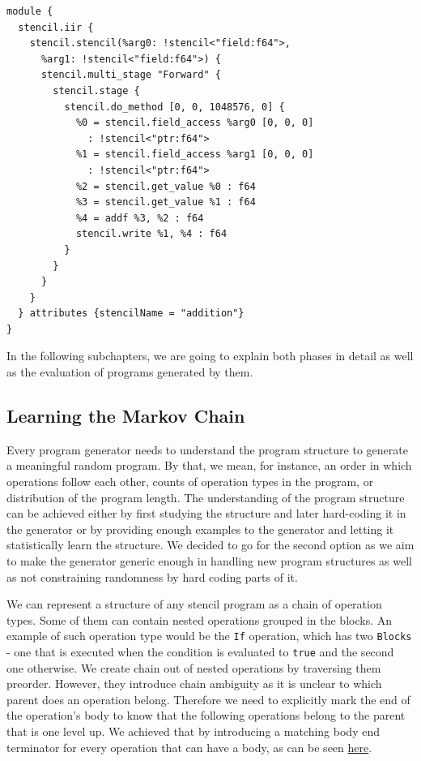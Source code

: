 \documentclass[sigplan,\review anonymous]{acmart}
\begin{document}
\begin{lstlisting}[caption={An example of the program generated 
  from the chain},captionpos=b\label{lst:sample}]
module {
  stencil.iir {
    stencil.stencil(%arg0: !stencil<"field:f64">,
      %arg1: !stencil<"field:f64">) {
      stencil.multi_stage "Forward" {
        stencil.stage {
          stencil.do_method [0, 0, 1048576, 0] {
            %0 = stencil.field_access %arg0 [0, 0, 0]
              : !stencil<"ptr:f64">
            %1 = stencil.field_access %arg1 [0, 0, 0]
              : !stencil<"ptr:f64">
            %2 = stencil.get_value %0 : f64
            %3 = stencil.get_value %1 : f64
            %4 = addf %3, %2 : f64
            stencil.write %1, %4 : f64
          }
        }
      }
    }
  } attributes {stencilName = "addition"}
}
\end{lstlisting}

In the following subchapters, we are going to explain both phases in detail
as well as the evaluation of programs generated by them.

\subsection{Learning the Markov Chain}
Every program generator needs to understand the program structure to generate
a meaningful random program. By that, we mean, for instance, an order in which
operations follow each other, counts of operation types in the program, or
distribution of the program length. The understanding of the program structure
can be achieved either by first studying the structure and later hard-coding
it in the generator or by providing enough examples to the generator and
letting it statistically learn the structure. We decided to go for the second
option as we aim to make the generator generic enough in handling new program
structures as well as not constraining randomness by hard coding parts of it.

We can represent a structure of any stencil program as a chain of operation
types. Some of them can contain nested operations grouped in the blocks. An
example of such operation type would be the \texttt{If} operation, which has
two \texttt{Blocks} - one that is executed when the condition is evaluated to
\texttt{true} and the second one otherwise. We create chain out of nested
operations by traversing them preorder. However, they introduce chain
ambiguity as it is unclear to which parent does an operation belong. Therefore
we need to explicitly mark the end of the operation's body to know that the
following operations belong to the parent that is one level up. We achieved
that by introducing a matching body end terminator for every operation that
can have a body, as can be seen \hyperref[chain]{here}.
\end{document}
